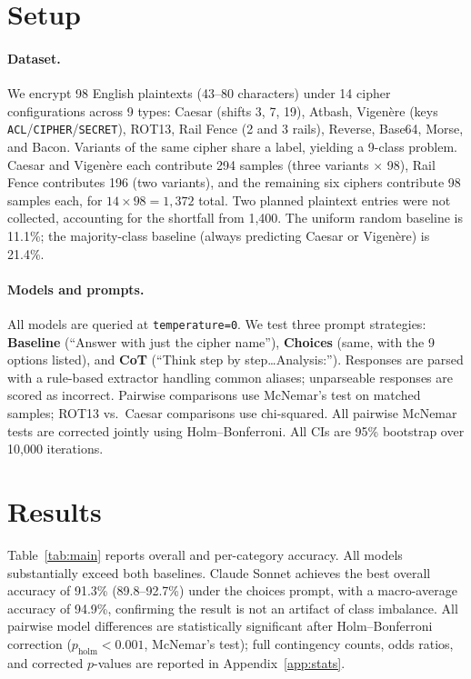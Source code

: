 \documentclass{article}
\begin{document}
\section{Setup}

\paragraph{Dataset.}
We encrypt 98 English plaintexts (43--80 characters) under 14 cipher
configurations across 9 types: Caesar (shifts 3, 7, 19), Atbash,
Vigen\`{e}re (keys \texttt{ACL}/\texttt{CIPHER}/\texttt{SECRET}), ROT13,
Rail Fence (2 and 3 rails), Reverse, Base64, Morse, and Bacon.
Variants of the same cipher share a label, yielding a 9-class problem.
Caesar and Vigen\`{e}re each contribute 294 samples (three variants $\times$ 98),
Rail Fence contributes 196 (two variants), and the remaining six ciphers contribute
98 samples each, for $14 \times 98 = 1{,}372$ total.
Two planned plaintext entries were not collected, accounting for the shortfall from 1,400.
The uniform random baseline is 11.1\%; the majority-class baseline
(always predicting Caesar or Vigen\`{e}re) is 21.4\%.

\paragraph{Models and prompts.}
All models are queried at \texttt{temperature=0}.
We test three prompt strategies: \textbf{Baseline} (``Answer with just the cipher name''),
\textbf{Choices} (same, with the 9 options listed), and \textbf{CoT}
(``Think step by step\ldots Analysis:'').
Responses are parsed with a rule-based extractor handling common aliases;
unparseable responses are scored as incorrect.
Pairwise comparisons use McNemar's test on matched samples; ROT13 vs.\ Caesar
comparisons use chi-squared. All pairwise McNemar tests are corrected jointly
using Holm--Bonferroni. All CIs are 95\% bootstrap over 10,000 iterations.

\section{Results}

Table~\ref{tab:main} reports overall and per-category accuracy.
All models substantially exceed both baselines.
Claude Sonnet achieves the best overall accuracy of 91.3\% (89.8--92.7\%)
under the choices prompt, with a macro-average accuracy of 94.9\%,
confirming the result is not an artifact of class imbalance.
All pairwise model differences are statistically significant after
Holm--Bonferroni correction ($p_{\text{holm}} < 0.001$, McNemar's test);
full contingency counts, odds ratios, and corrected $p$-values are reported
in Appendix~\ref{app:stats}.
\end{document}
